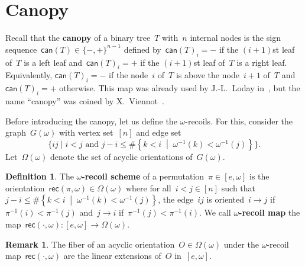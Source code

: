 \documentclass{amsart}
\theoremstyle{definition}
\newtheorem{definition}[theorem]{Definition}
\newtheorem{remark}[theorem]{Remark}
\newcommand{\set}[2]{\left\{ #1 \;\middle|\; #2 \right\}} %
\newcommand{\bigset}[2]{\big\{ #1 \;|\; #2 \big\}} %
\newcommand{\defn}[1]{\textbf{\textsf{\color{PineGreen} #1}}} %
\newcommand{\acyclicOrientations}{\Omega} %
\newcommand{\recoils}[2]{\mathsf{rec}(#1,#2)} %
\newcommand{\canopy}[1]{\mathsf{can}(#1)} %
\begin{document}

\section{Canopy}
\label{sec:canopy}

Recall that the \defn{canopy} of a binary tree~$T$ with~$n$ internal nodes is the sign sequence~${\canopy{T} \in \{{-},{+}\}^{n-1}}$ defined by~$\canopy{T}_i = {-}$ if the $(i+1)$st leaf of~$T$ is a left leaf and~$\canopy{T}_i = {+}$ if the $(i+1)$st leaf of~$T$ is a right leaf.
Equivalently, $\canopy{T}_i = -$ if the node~$i$ of~$T$ is above the node~$i+1$ of~$T$ and~$\canopy{T}_i = +$ otherwise.
This map was already used by J.-L.~Loday in~\cite{LodayRonco, Loday}, but the name ``canopy'' was coined by X.~Viennot~\cite{Viennot}.

Before introducing the canopy, let us define the $\omega$-recoils.
For this, consider the graph~$G(\omega)$ with vertex set~$[n]$ and edge set
\[
\bigset{ij}{i < j \text{ and } j-i \le \#\set{k < i}{\omega^{-1}(k) < \omega^{-1}(j)}}.
\]
Let~$\acyclicOrientations(\omega)$ denote the set of acyclic orientations of~$G(\omega)$.

\begin{definition}
The \defn{$\omega$-recoil scheme} of a permutation~$\pi \in [e,\omega]$ is the orientation~${\recoils{\pi}{\omega} \in \acyclicOrientations(\omega)}$ where for all~$i < j \in [n]$ such that~$j-i \le \#\set{k < i}{\omega^{-1}(k) < \omega^{-1}(j)}$, the edge~$ij$ is oriented~$i \to j$ if~$\pi^{-1}(i) < \pi^{-1}(j)$ and~$j \to i$ if~$\pi^{-1}(j) < \pi^{-1}(i)$.
We call \defn{$\omega$-recoil map} the map~$\recoils{\cdot}{\omega} : [e,\omega] \to \acyclicOrientations(\omega)$.
\end{definition}

\begin{remark}
The fiber of an acyclic orientation~$O \in \acyclicOrientations(\omega)$ under the $\omega$-recoil map~$\recoils{\cdot}{\omega}$ are the linear extensions of~$O$ in~$[e,\omega]$.
\end{remark}
\end{document}
